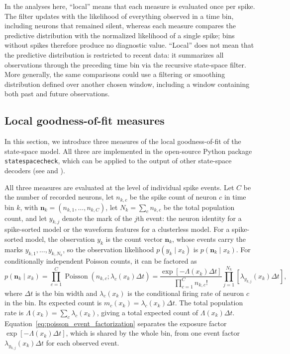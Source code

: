 \documentclass[12pt]{article}
\begin{document}
In the analyses here, ``local'' means that each measure is evaluated once per spike. The filter updates with the likelihood of everything observed in a time bin, including neurons that remained silent, whereas each measure compares the predictive distribution with the normalized likelihood of a single spike; bins without spikes therefore produce no diagnostic value. ``Local'' does not mean that the predictive distribution is restricted to recent data: it summarizes all observations through the preceding time bin via the recursive state-space filter. More generally, the same comparisons could use a filtering or smoothing distribution defined over another chosen window, including a window containing both past and future observations.

\subsection*{Local goodness-of-fit measures}\label{sec:metrics}
In this section, we introduce three measures of the local goodness-of-fit of the state-space model. All three are implemented in the open-source Python package \texttt{statespacecheck}, which can be applied to the output of other state-space decoders (see  and ).

All three measures are evaluated at the level of individual spike events. Let $C$ be the number of recorded neurons, let $n_{k,c}$ be the spike count of neuron $c$ in time bin $k$, with $\mathbf{n}_k=(n_{k,1},\ldots,n_{k,C})$, let $N_k=\sum_c n_{k,c}$ be the total population count, and let $y_{k,j}$ denote the mark of the $j$th event: the neuron identity for a spike-sorted model or the waveform features for a clusterless model. For a spike-sorted model, the observation $y_k$ is the count vector $\mathbf{n}_k$, whose events carry the marks $y_{k,1},\ldots,y_{k,N_k}$, so the observation likelihood $p(y_k \mid x_k)$ is $p(\mathbf{n}_k \mid x_k)$. For conditionally independent Poisson counts, it can be factored as
\begin{equation}
    \label{eq:poisson_event_factorization}
    p(\mathbf{n}_k \mid x_k)
    = \prod_{c=1}^{C}\operatorname{Poisson}\!\left(n_{k,c};\lambda_c(x_k)\Delta t\right)
    = \frac{\exp[-\Lambda(x_k)\Delta t]}{\prod_{c=1}^{C}n_{k,c}!}
      \prod_{j=1}^{N_k}\left[\lambda_{y_{k,j}}(x_k)\Delta t\right],
\end{equation}
where $\Delta t$ is the bin width and $\lambda_c(x_k)$ is the conditional firing rate of neuron $c$ in the bin. Its expected count is $m_c(x_k)=\lambda_c(x_k)\Delta t$. The total population rate is $\Lambda(x_k)=\sum_c\lambda_c(x_k)$, giving a total expected count of $\Lambda(x_k)\Delta t$. Equation~\eqref{eq:poisson_event_factorization} separates the exposure factor $\exp[-\Lambda(x_k)\Delta t]$, which is shared by the whole bin, from one event factor $\lambda_{y_{k,j}}(x_k)\Delta t$ for each observed event.
\end{document}
